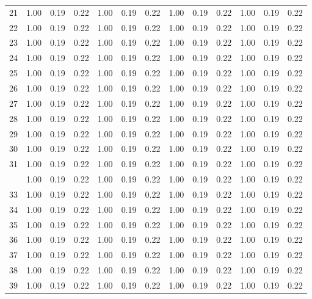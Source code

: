 \begin{center}
\begin{longtable}{|c|c|c|c|c|c|c|c|c|c|c|c|c|}
21 & 1.00 & 0.19 & 0.22 & 1.00 & 0.19 & 0.22 & 1.00 & 0.19 & 0.22 & 1.00 & 0.19 & 0.22 \\
22 & 1.00 & 0.19 & 0.22 & 1.00 & 0.19 & 0.22 & 1.00 & 0.19 & 0.22 & 1.00 & 0.19 & 0.22 \\
23 & 1.00 & 0.19 & 0.22 & 1.00 & 0.19 & 0.22 & 1.00 & 0.19 & 0.22 & 1.00 & 0.19 & 0.22 \\
24 & 1.00 & 0.19 & 0.22 & 1.00 & 0.19 & 0.22 & 1.00 & 0.19 & 0.22 & 1.00 & 0.19 & 0.22 \\
25 & 1.00 & 0.19 & 0.22 & 1.00 & 0.19 & 0.22 & 1.00 & 0.19 & 0.22 & 1.00 & 0.19 & 0.22 \\
26 & 1.00 & 0.19 & 0.22 & 1.00 & 0.19 & 0.22 & 1.00 & 0.19 & 0.22 & 1.00 & 0.19 & 0.22 \\
27 & 1.00 & 0.19 & 0.22 & 1.00 & 0.19 & 0.22 & 1.00 & 0.19 & 0.22 & 1.00 & 0.19 & 0.22 \\
28 & 1.00 & 0.19 & 0.22 & 1.00 & 0.19 & 0.22 & 1.00 & 0.19 & 0.22 & 1.00 & 0.19 & 0.22 \\
29 & 1.00 & 0.19 & 0.22 & 1.00 & 0.19 & 0.22 & 1.00 & 0.19 & 0.22 & 1.00 & 0.19 & 0.22 \\
30 & 1.00 & 0.19 & 0.22 & 1.00 & 0.19 & 0.22 & 1.00 & 0.19 & 0.22 & 1.00 & 0.19 & 0.22 \\
31 & 1.00 & 0.19 & 0.22 & 1.00 & 0.19 & 0.22 & 1.00 & 0.19 & 0.22 & 1.00 & 0.19 & 0.22 \\
\pagebreak
32 & 1.00 & 0.19 & 0.22 & 1.00 & 0.19 & 0.22 & 1.00 & 0.19 & 0.22 & 1.00 & 0.19 & 0.22 \\
33 & 1.00 & 0.19 & 0.22 & 1.00 & 0.19 & 0.22 & 1.00 & 0.19 & 0.22 & 1.00 & 0.19 & 0.22 \\
34 & 1.00 & 0.19 & 0.22 & 1.00 & 0.19 & 0.22 & 1.00 & 0.19 & 0.22 & 1.00 & 0.19 & 0.22 \\
35 & 1.00 & 0.19 & 0.22 & 1.00 & 0.19 & 0.22 & 1.00 & 0.19 & 0.22 & 1.00 & 0.19 & 0.22 \\
36 & 1.00 & 0.19 & 0.22 & 1.00 & 0.19 & 0.22 & 1.00 & 0.19 & 0.22 & 1.00 & 0.19 & 0.22 \\
37 & 1.00 & 0.19 & 0.22 & 1.00 & 0.19 & 0.22 & 1.00 & 0.19 & 0.22 & 1.00 & 0.19 & 0.22 \\
38 & 1.00 & 0.19 & 0.22 & 1.00 & 0.19 & 0.22 & 1.00 & 0.19 & 0.22 & 1.00 & 0.19 & 0.22 \\
39 & 1.00 & 0.19 & 0.22 & 1.00 & 0.19 & 0.22 & 1.00 & 0.19 & 0.22 & 1.00 & 0.19 & 0.22 \\

\end{longtable}
\end{center}
